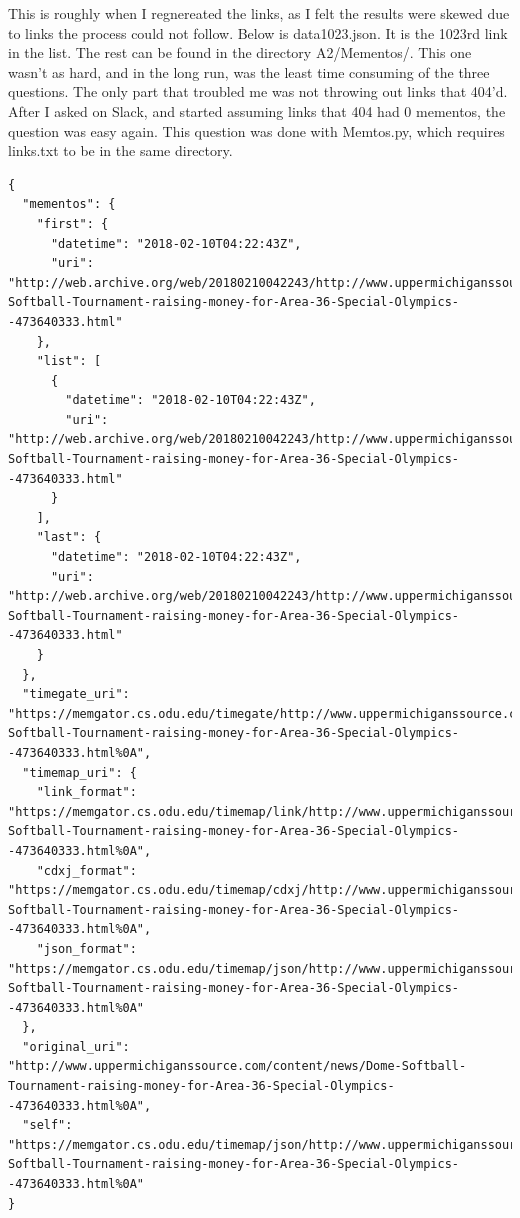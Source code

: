 \documentclass{article}
\begin{document}
This is roughly when I regnereated the links, as I felt the results were skewed due to links the process could not follow. Below is data1023.json. It is the 1023rd link in the list. The rest can be found in the directory A2/Mementos/. This one wasn't as hard, and in the long run, was the least time consuming of the three questions. The only part that troubled me was not throwing out links that 404'd. After I asked on Slack, and started assuming links that 404 had 0 mementos, the question was easy again. This question was done with Memtos.py, which requires links.txt to be in the same directory.
\begin{lstlisting}
{
  "mementos": {
    "first": {
      "datetime": "2018-02-10T04:22:43Z",
      "uri": "http://web.archive.org/web/20180210042243/http://www.uppermichiganssource.com/content/news/Dome-Softball-Tournament-raising-money-for-Area-36-Special-Olympics--473640333.html"
    },
    "list": [
      {
        "datetime": "2018-02-10T04:22:43Z",
        "uri": "http://web.archive.org/web/20180210042243/http://www.uppermichiganssource.com/content/news/Dome-Softball-Tournament-raising-money-for-Area-36-Special-Olympics--473640333.html"
      }
    ],
    "last": {
      "datetime": "2018-02-10T04:22:43Z",
      "uri": "http://web.archive.org/web/20180210042243/http://www.uppermichiganssource.com/content/news/Dome-Softball-Tournament-raising-money-for-Area-36-Special-Olympics--473640333.html"
    }
  },
  "timegate_uri": "https://memgator.cs.odu.edu/timegate/http://www.uppermichiganssource.com/content/news/Dome-Softball-Tournament-raising-money-for-Area-36-Special-Olympics--473640333.html%0A",
  "timemap_uri": {
    "link_format": "https://memgator.cs.odu.edu/timemap/link/http://www.uppermichiganssource.com/content/news/Dome-Softball-Tournament-raising-money-for-Area-36-Special-Olympics--473640333.html%0A",
    "cdxj_format": "https://memgator.cs.odu.edu/timemap/cdxj/http://www.uppermichiganssource.com/content/news/Dome-Softball-Tournament-raising-money-for-Area-36-Special-Olympics--473640333.html%0A",
    "json_format": "https://memgator.cs.odu.edu/timemap/json/http://www.uppermichiganssource.com/content/news/Dome-Softball-Tournament-raising-money-for-Area-36-Special-Olympics--473640333.html%0A"
  },
  "original_uri": "http://www.uppermichiganssource.com/content/news/Dome-Softball-Tournament-raising-money-for-Area-36-Special-Olympics--473640333.html%0A",
  "self": "https://memgator.cs.odu.edu/timemap/json/http://www.uppermichiganssource.com/content/news/Dome-Softball-Tournament-raising-money-for-Area-36-Special-Olympics--473640333.html%0A"
}
\end{lstlisting}
\pagebreak
\end{document}
